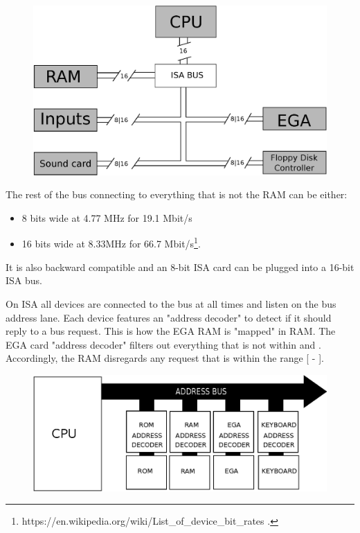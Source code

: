 \documentclass[book.tex]{subfiles}
\begin{document}
\begin{figure}[H]
\centering
      \includegraphics[width=1.0\textwidth]{imgs/drawings/bus.eps}
\end{figure}

\par
The rest of the bus connecting to everything that is not the RAM can be either:
\begin{itemize}
\item 8 bits wide at 4.77 MHz  for 19.1 Mbit/s
\item 16 bits wide at 8.33MHz for 66.7 Mbit/s\footnote{https://en.wikipedia.org/wiki/List\_of\_device\_bit\_rates .}.
\end{itemize}
It is also backward compatible and an 8-bit ISA card can be plugged into a 16-bit ISA bus.\\
\par
\vspace{10pt}
 On ISA all devices are connected to the bus at all times and listen on the bus address lane. Each device features an "address decoder" to detect if it should reply to a bus request. This is how the EGA RAM is "mapped" in RAM. The EGA card "address decoder"  filters out everything that is not within  and . Accordingly, the RAM disregards any request that is within the range [ - ].\\
\par
 \begin{figure}[H]
\centering
\includegraphics[width=\textwidth]{imgs/drawings/isa.eps}
\end{figure}
\end{document}
